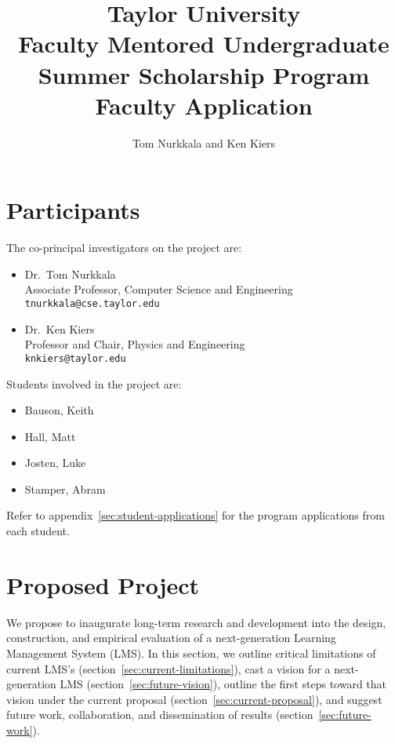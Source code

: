 \documentclass{article}
\title{Taylor University\\
  Faculty Mentored Undergraduate\\
  Summer Scholarship Program\\
  Faculty Application}
\author{Tom Nurkkala and Ken Kiers}
\begin{document}
\maketitle

\setcounter{tocdepth}{2}
\tableofcontents
\newpage

\section{Participants}
\label{sec:participants}

The co-principal investigators on the project are:
\begin{itemize}
\item Dr.\ Tom Nurkkala\\
  Associate Professor, Computer Science and Engineering\\
  \texttt{tnurkkala@cse.taylor.edu}
\item Dr.\ Ken Kiers\\
  Professor and Chair, Physics and Engineering\\
  \texttt{knkiers@taylor.edu}
\end{itemize}
Students involved in the project are:
\begin{itemize}
\item Bauson, Keith
\item Hall, Matt
\item Josten, Luke
\item Stamper, Abram
\end{itemize}
Refer to appendix~\ref{sec:student-applications}
for the program applications from each student.


\section{Proposed Project}
\label{sec:proposed-project}


We propose to inaugurate long-term research and development
into the design, construction, and empirical evaluation
of a next-generation Learning Management System (LMS).
In this section, we
outline critical limitations of current LMS's (section~\ref{sec:current-limitations}),
cast a vision for a next-generation LMS (section~\ref{sec:future-vision}),
outline the first steps toward that vision under the current proposal (section~\ref{sec:current-proposal}),
and suggest future work, collaboration, and dissemination of results (section~\ref{sec:future-work}).
\end{document}
